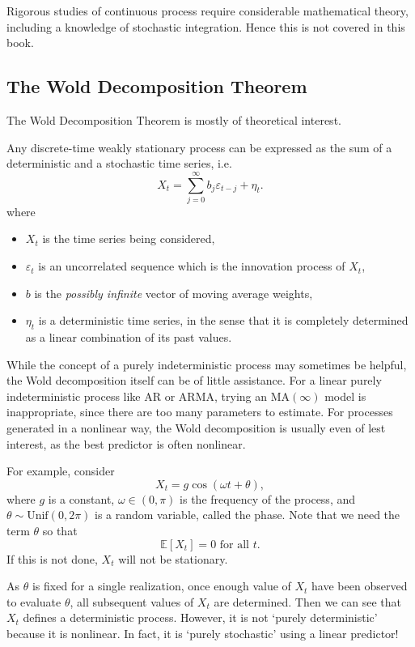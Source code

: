 Rigorous studies of continuous process require considerable mathematical theory, including a knowledge of 
stochastic integration. Hence this is not covered in this book.



\subsection{The Wold Decomposition Theorem}
The Wold Decomposition Theorem is mostly of theoretical interest.

\begin{theorem*}
Any discrete-time weakly stationary process can be expressed as the sum of a deterministic and a stochastic 
time series, i.e.
\[ X_t = \sum_{j = 0}^{\infty} b_j \varepsilon_{t - j} + \eta_t. \]
where 
\begin{itemize}
	\item $X_t$ is the time series being considered, 
	\item $\varepsilon_t$ is an uncorrelated sequence which is the innovation process of $X_t$,
	\item $b$ is the \textit{possibly infinite} vector of moving average weights, 
	\item $\eta_t$ is a deterministic time series, in the sense that it is completely determined as a linear 
	combination of its past values.	
\end{itemize}	
\end{theorem*}

While the concept of a purely indeterministic process may sometimes be helpful, the Wold decomposition itself 
can be of little assistance. For a linear purely indeterministic process like AR or ARMA, trying an 
$\mathrm{MA}(\infty)$ model is inappropriate, since there are too many parameters to estimate. For processes 
generated in a nonlinear way, the Wold decomposition is usually even of lest interest, as the best predictor 
is often nonlinear.

For example, consider 
\[ X_t = g \cos{(\omega t + \theta)}, \]
where $g$ is a constant, $\omega \in (0, \pi)$ is the frequency of the process, and $\theta \sim 
\mathrm{Unif}(0, 2 \pi)$ is a random variable, called the phase. Note that we need the term $\theta$ so that 
\[ \mathbb{E}\left[ X_t \right] = 0 \text{ for all } t. \]
If this is not done, $X_t$ will not be stationary.

As $\theta$ is fixed for a single realization, once enough value of $X_t$ have been observed to evaluate 
$\theta$, all subsequent values of $X_t$ are determined. Then we can see that $X_t$ defines a deterministic 
process. However, it is not `purely deterministic' because it is nonlinear. In fact, it is `purely stochastic' 
using a linear predictor!
